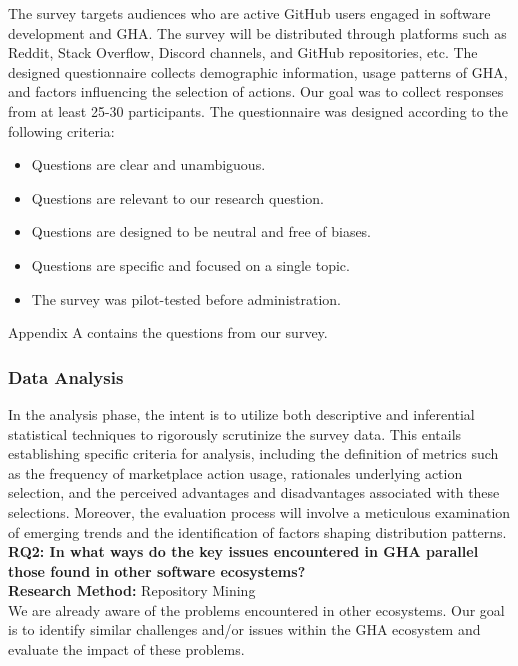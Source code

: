 \documentclass[conference]{IEEEtran}
\begin{document}
	The survey targets audiences who are active GitHub users engaged in software development and GHA. The survey will be distributed through platforms such as Reddit, Stack Overflow, Discord channels, and GitHub repositories, etc. The designed questionnaire collects demographic information, usage patterns of GHA, and factors influencing the selection of actions. Our goal was to collect responses from at least 25-30 participants. The questionnaire was designed according to the following criteria:\\
 \begin{itemize}
	\item Questions are clear and unambiguous.
	\item Questions are relevant to our research question.
	\item Questions are designed to be neutral and free of biases.
	\item Questions are specific and focused on a single topic.
	\item The survey was pilot-tested before administration.\\
 \end{itemize}
Appendix A contains the questions from our survey.\\
        \subsubsection{\textbf{Data Analysis}}
            In the analysis phase, the intent is to utilize both descriptive and inferential statistical techniques to rigorously scrutinize the survey data.  This entails establishing specific criteria for analysis, including the definition of metrics such as the frequency of marketplace action usage, rationales underlying action selection, and the perceived advantages and disadvantages associated with these selections. Moreover, the evaluation process will involve a meticulous examination of emerging trends and the identification of factors shaping distribution patterns.\\

        \textbf{RQ2: In what ways do the key issues encountered in GHA parallel those found in other software ecosystems?}\\

        \textbf{Research Method:} Repository Mining\\

        We are already aware of the problems encountered in other ecosystems. Our goal is to identify similar challenges and/or issues within the GHA ecosystem and evaluate the impact of these problems.\\
\end{document}
